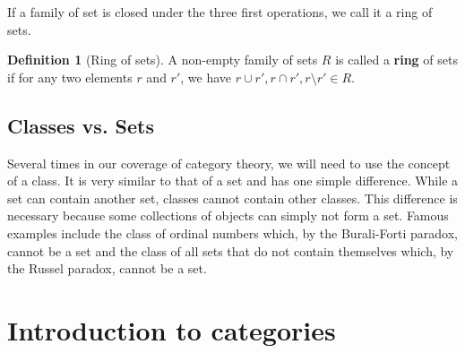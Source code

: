 \documentclass{scrartcl}
\theoremstyle{definition}
\newtheorem{defn}[thm]{Definition}
\theoremstyle{remark}
\begin{document}
If a family of set is closed under the three first operations, we call it a ring of sets.
\begin{defn}[Ring of sets]
A non-empty family of sets $R$ is called a \textbf{ring} of sets if for any two elements $r$ and $r'$, we have $r \cup r', r\cap r', r \setminus r' \in R$.
\end{defn}

\subsection{Classes vs. Sets}
Several times in our coverage of category theory, we will need to use the concept of a class. It is very similar to that of a set and has one simple difference. While a set can contain another set, classes cannot contain other classes. This difference is necessary because some collections of objects can simply not form a set. Famous examples include the class of ordinal numbers which, by the Burali-Forti paradox, cannot be a set and the class of all sets that do not contain themselves which, by the Russel paradox, cannot be a set.

\section{Introduction to categories}
\end{document}
